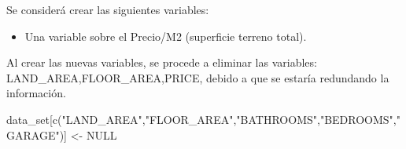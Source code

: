 \documentclass[
]{article}
\newenvironment{Shaded}{\begin{snugshade}}{\end{snugshade}}
\newcommand{\ConstantTok}[1]{\textcolor[rgb]{0.00,0.00,0.00}{#1}}
\newcommand{\FunctionTok}[1]{\textcolor[rgb]{0.00,0.00,0.00}{#1}}
\newcommand{\NormalTok}[1]{#1}
\newcommand{\OtherTok}[1]{\textcolor[rgb]{0.56,0.35,0.01}{#1}}
\newcommand{\SpecialCharTok}[1]{\textcolor[rgb]{0.00,0.00,0.00}{#1}}
\newcommand{\StringTok}[1]{\textcolor[rgb]{0.31,0.60,0.02}{#1}}
\providecommand{\tightlist}{%
  \setlength{\itemsep}{0pt}\setlength{\parskip}{0pt}}
\begin{document}
\begin{Shaded}
\end{Shaded}

Se considerá crear las siguientes variables:

\begin{itemize}
\tightlist
\item
  Una variable sobre el Precio/M2 (superficie terreno total).
\end{itemize}

\begin{Shaded}
\end{Shaded}

Al crear las nuevas variables, se procede a eliminar las variables:
LAND\_AREA,FLOOR\_AREA,PRICE, debido a que se estaría redundando la
información.

\begin{Shaded}
\begin{Highlighting}[]
\NormalTok{data\_set[}\FunctionTok{c}\NormalTok{(}\StringTok{"LAND\_AREA"}\NormalTok{,}\StringTok{"FLOOR\_AREA"}\NormalTok{,}\StringTok{"BATHROOMS"}\NormalTok{,}\StringTok{"BEDROOMS"}\NormalTok{,}\StringTok{"GARAGE"}\NormalTok{)] }\OtherTok{\textless{}{-}} \ConstantTok{NULL}
\end{Highlighting}
\end{Shaded}
\end{document}
